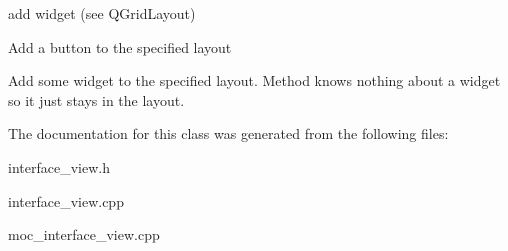 add widget (see QGridLayout) 

Add a button to the specified layout

Add some widget to the specified layout. Method knows nothing about a widget so it just stays in the layout. 

The documentation for this class was generated from the following files:\begin{CompactItemize}
\item 
interface\_\-view.h\item 
interface\_\-view.cpp\item 
moc\_\-interface\_\-view.cpp\end{CompactItemize}
